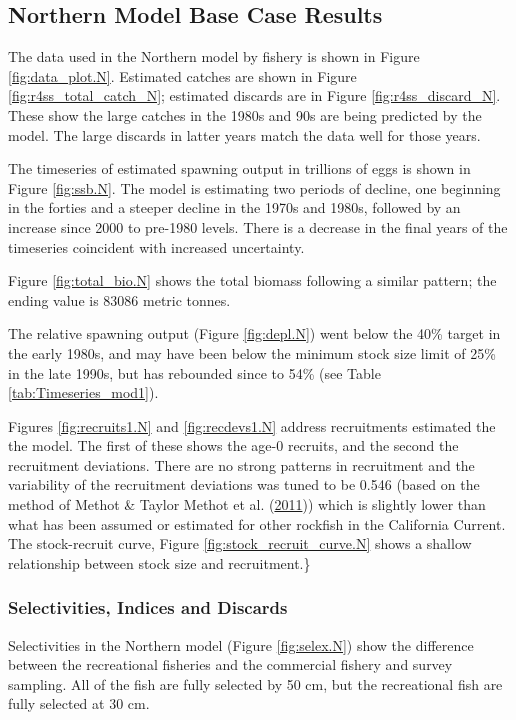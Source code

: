 \documentclass[12pt,]{article}
\begin{document}
\subsection{Northern Model Base Case
Results}\label{northern-model-base-case-results}

The data used in the Northern model by fishery is shown in Figure
\ref{fig:data_plot.N}. Estimated catches are shown in Figure
\ref{fig:r4ss_total_catch_N}; estimated discards are in Figure
\ref{fig:r4ss_discard_N}. These show the large catches in the 1980s and
90s are being predicted by the model. The large discards in latter years
match the data well for those years.

The timeseries of estimated spawning output in trillions of eggs is
shown in Figure \ref{fig:ssb.N}. The model is estimating two periods of
decline, one beginning in the forties and a steeper decline in the 1970s
and 1980s, followed by an increase since 2000 to pre-1980 levels. There
is a decrease in the final years of the timeseries coincident with
increased uncertainty.

Figure \ref{fig:total_bio.N} shows the total biomass following a similar
pattern; the ending value is 83086 metric tonnes.

The relative spawning output (Figure \ref{fig:depl.N}) went below the
40\% target in the early 1980s, and may have been below the minimum
stock size limit of 25\% in the late 1990s, but has rebounded since to
54\% (see Table \ref{tab:Timeseries_mod1}).

Figures \ref{fig:recruits1.N} and \ref{fig:recdevs1.N} address
recruitments estimated the the model. The first of these shows the age-0
recruits, and the second the recruitment deviations. There are no strong
patterns in recruitment and the variability of the recruitment
deviations was tuned to be 0.546 (based on the method of Methot \&
Taylor Methot et al. (\protect\hyperlink{ref-Methot2011}{2011})) which
is slightly lower than what has been assumed or estimated for other
rockfish in the California Current. The stock-recruit curve, Figure
\ref{fig:stock_recruit_curve.N} shows a shallow relationship between
stock size and recruitment.\}

\subsubsection{Selectivities, Indices and
Discards}\label{selectivities-indices-and-discards}

Selectivities in the Northern model (Figure \ref{fig:selex.N}) show the
difference between the recreational fisheries and the commercial fishery
and survey sampling. All of the fish are fully selected by 50 cm, but
the recreational fish are fully selected at 30 cm.
\end{document}
